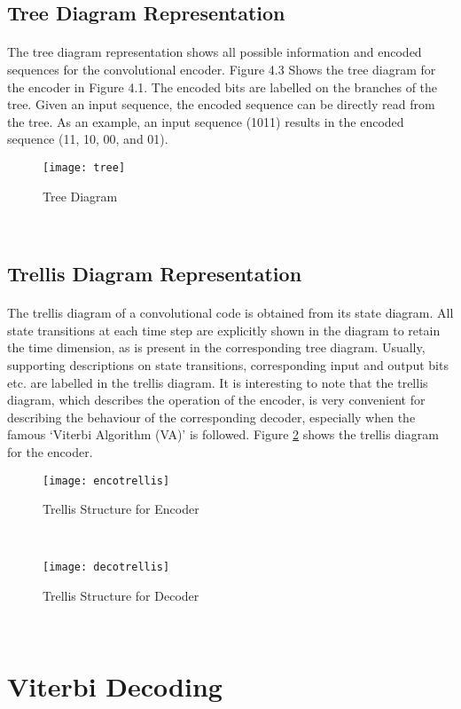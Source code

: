 \documentclass[14pt]{report}
\begin{document}
{\subsection{Tree Diagram Representation}
\paragraph{} The tree diagram representation shows all possible information and encoded sequences for the convolutional encoder. Figure 4.3 Shows the tree diagram for the encoder in Figure 4.1.  The encoded bits are labelled on the branches of the tree. Given an input sequence, the encoded sequence can be directly read from the tree. As an example, an input sequence (1011) results in the encoded sequence (11, 10, 00, and 01).
\begin{figure}[ht]
\centering
\texttt{[image: tree]}
\label{fig:tr}
\caption{Tree Diagram}
\end{figure}\\
\subsection{Trellis Diagram Representation}
\paragraph{} The trellis diagram of a convolutional code is obtained from its state diagram. All state transitions at each time step are explicitly shown in the diagram to retain the time dimension, as is present in the corresponding tree diagram. Usually, supporting descriptions on state transitions, corresponding input and output bits etc. are labelled in the trellis diagram. It is interesting to note that the trellis diagram, which describes the operation of the encoder, is very convenient for describing the behaviour of the corresponding decoder, especially when the famous ‘Viterbi Algorithm (VA)’ is followed. Figure \ref{fig:et}  shows the trellis diagram for the encoder.
\begin{figure}[ht]
\centering
\texttt{[image: encotrellis]}
\label{fig:et}
\caption{Trellis Structure for Encoder}
\end{figure}\\
\begin{figure}[ht]
\centering
\texttt{[image: decotrellis]}
\label{fig:dt}
\caption{Trellis Structure for Decoder}
\end{figure}\\
\section{Viterbi Decoding}
}
\end{document}
